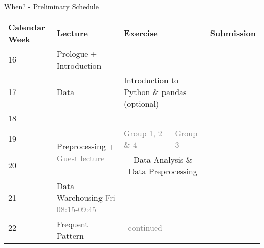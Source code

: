 \begin{frame}{When? - Preliminary Schedule}
	\footnotesize
	\centering
	\begin{tabular}{|p{4em}|p{15em}|p{9.5em}|p{9.5em}|p{10em}|}
		\hline
		\rowcolor{faugray!62}\textbf{Calendar Week} & \textbf{Lecture}                                                  & \multicolumn{2}{|l|}{\textbf{Exercise}}                                         & \textbf{Submission}                                                      \\ \hhline{*{5}{:=}:}
		\cellcolor{faugray!25}16                    & Prologue + Introduction                                           & \multicolumn{2}{|l|}{\cellcolor{gray!50}}                                       & \cellcolor{gray!50}                                                      \\ \hhline{|-|-|-|-|-|}
		\cellcolor{faugray!25}17                    & Data                                                              & \multicolumn{2}{|l|}{Introduction to Python \& pandas {\color{gray}(optional)}} & \cellcolor{gray!50}                                                      \\ \hhline{|-|-|-|-|-|}
		\cellcolor{faugray!25}18                    & \multicolumn{4}{|l|}{\cellcolor{gray!50}}                                                                                                                                                                                      \\ \hhline{|-|-|-|-|-|}
		\cellcolor{faugray!25}19                    & \multirow{2}{*}{Preprocessing \textcolor{gray}{ + Guest lecture}} & \centering\tiny\textcolor{gray}{Group 1, 2 \& 4}                                   & \centering\tiny\textcolor{gray}{Group 3}      & \cellcolor{gray!50} \\ \hhline{|-|~|~~|-|}
		\cellcolor{faugray!25}20                    &                                                                   & \multicolumn{2}{|c|}{Data Analysis \& Data Preprocessing}                       & \cellcolor{gray!50}                                                      \\ \hhline{|--|~|~|-|}
		\cellcolor{faugray!25}21                    & Data Warehousing \textcolor{gray}{\tiny Fri 08:15-09:45}          & \cellcolor{gray!50}                                                             &                                                    & \cellcolor{gray!50} \\ \hhline{|-|-|-|-|-|}
		\cellcolor{faugray!25}22                    & \multirow{2}{*}{Frequent Pattern}                                 & \multicolumn{1}{|c|}{\textcolor{gray}{\tiny continued}}                         & \cellcolor{gray!50}                                & \cellcolor{gray!50} \\ \hhline{|-|~|-|-|-|}

\end{tabular}
\end{frame}
